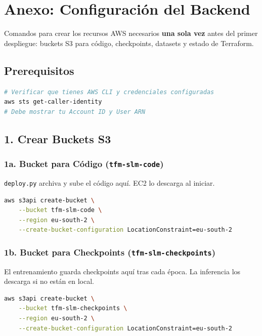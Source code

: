 \section{Anexo: Configuración del Backend}
\label{sec:anexo_setup_backend}

Comandos para crear los recursos AWS necesarios \textbf{una sola vez} antes del primer despliegue: buckets S3 para código, checkpoints, datasets y estado de Terraform.

\subsection{Prerequisitos}

\begin{lstlisting}[language=bash, caption={Verificación de credenciales AWS.}]
# Verificar que tienes AWS CLI y credenciales configuradas
aws sts get-caller-identity
# Debe mostrar tu Account ID y User ARN
\end{lstlisting}

\subsection{1. Crear Buckets S3}

\subsubsection{1a. Bucket para Código (\texttt{tfm-slm-code})}
\texttt{deploy.py} archiva y sube el código aquí. EC2 lo descarga al iniciar.

\begin{lstlisting}[language=bash]
aws s3api create-bucket \
    --bucket tfm-slm-code \
    --region eu-south-2 \
    --create-bucket-configuration LocationConstraint=eu-south-2
\end{lstlisting}

\subsubsection{1b. Bucket para Checkpoints (\texttt{tfm-slm-checkpoints})}
El entrenamiento guarda checkpoints aquí tras cada época. La inferencia los descarga si no están en local.

\begin{lstlisting}[language=bash]
aws s3api create-bucket \
    --bucket tfm-slm-checkpoints \
    --region eu-south-2 \
    --create-bucket-configuration LocationConstraint=eu-south-2
\end{lstlisting}

